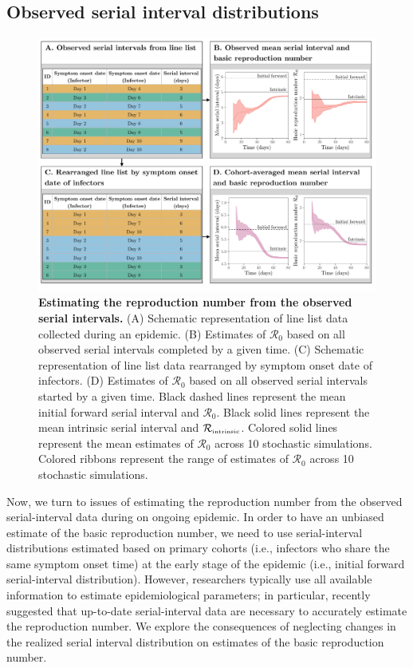 \documentclass[12pt]{article}
\newcommand{\Rx}[1]{\ensuremath{{\mathcal R}_{#1}}\xspace}
\newcommand{\Ro}{\Rx{0}}
\newcommand{\Rintrinsic}{\ensuremath{{\mathcal R}_{\textrm{\tiny intrinsic}}}\xspace}
\begin{document}
\subsection{Observed serial interval distributions}

\begin{figure}[!ht]
\includegraphics[width=\textwidth]{diagram.pdf}
\caption{
\textbf{Estimating the reproduction number from the observed serial intervals.}
(A) Schematic representation of line list data collected during an epidemic.
(B) Estimates of \Ro based on all observed serial intervals completed by a given time.
(C) Schematic representation of line list data rearranged by symptom onset date of infectors.
(D) Estimates of \Ro based on all observed serial intervals started by a given time. 
Black dashed lines represent the mean initial forward serial interval and \Ro.
Black solid lines represent the mean intrinsic serial interval and \Rintrinsic.
Colored solid lines represent the mean estimates of \Ro across 10 stochastic simulations.
Colored ribbons represent the range of estimates of \Ro across 10 stochastic simulations.
}
\label{fig:obsrR}
\end{figure}

Now, we turn to issues of estimating the reproduction number from the observed serial-interval data during on ongoing epidemic.
In order to have an unbiased estimate of the basic reproduction number, we need to use serial-interval distributions estimated based on primary cohorts (i.e., infectors who share the same symptom onset time) at the early stage of the epidemic (i.e., initial forward serial-interval distribution).
However, researchers typically use all available information to estimate epidemiological parameters;
in particular, \cite{thompson2019improved} recently suggested that up-to-date serial-interval data are necessary to accurately estimate the reproduction number.
We explore the consequences of neglecting changes in the realized serial interval distribution on estimates of the basic reproduction number.
\end{document}
